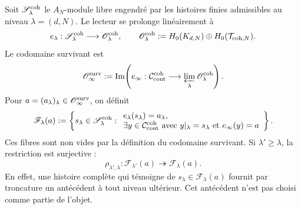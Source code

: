 Soit \(\mathscr S_\lambda^{\rm coh}\) le \(A_N\)-module libre engendré par les
histoires finies admissibles au niveau \(\lambda=(d,N)\). Le lecteur se
prolonge linéairement à
\begin{equation}\label{eq:pdfv2-coh-e-lambda}
 e_\lambda:\mathscr S_\lambda^{\rm coh}
 \longrightarrow\mathscr O_\lambda^{\rm coh},
 \qquad
 \mathscr O_\lambda^{\rm coh}
 :=H_0(K_{d,N})\oplus H_0(\mathcal T_{{\rm coh},N}).
\end{equation}
Le codomaine survivant est
\begin{equation}\label{eq:pdfv2-coh-surviving-output}
 \mathscr O_\infty^{\rm surv}
 :=\operatorname{Im}\!\left(
 e_\infty:\mathcal C_{\rm cont}^{\rm coh}
 \longrightarrow\varprojlim_\lambda\mathscr O_\lambda^{\rm coh}
 \right).
\end{equation}
Pour \(a=(a_\lambda)_\lambda\in\mathscr O_\infty^{\rm surv}\), on définit
\begin{equation}\label{eq:pdfv2-coh-fiber}
 \mathscr F_\lambda(a):=
 \left\{s_\lambda\in\mathscr S_\lambda^{\rm coh}:
 \begin{array}{l}
 e_\lambda(s_\lambda)=a_\lambda,\\
 \exists y\in\mathcal C_{\rm cont}^{\rm coh}\text{ avec }
 y|_\lambda=s_\lambda\text{ et }e_\infty(y)=a
 \end{array}
 \right\}.
\end{equation}
Ces fibres sont non vides par la définition du codomaine survivant. Si
\(\lambda'\geq\lambda\), la restriction est surjective :
\begin{equation}\label{eq:pdfv2-coh-fiber-surjection}
 \rho_{\lambda',\lambda}:\mathscr F_{\lambda'}(a)
 \twoheadrightarrow\mathscr F_\lambda(a).
\end{equation}
En effet, une histoire complète qui témoigne de
\(s_\lambda\in\mathscr F_\lambda(a)\) fournit par troncature un
antécédent à tout niveau ultérieur. Cet antécédent n'est pas choisi comme
partie de l'objet.

